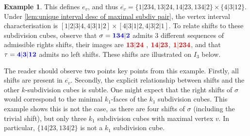 \documentclass{amsart}
\newcommand{\red}{\color{red}} %
\newcommand{\blue}{\color{blue}} %
\theoremstyle{definition}
\newtheorem{example}[theorem]{Example}
\newcommand{\subdivpairsv}{e_v}
\newcommand{\maxsubdivpairsv}{\overline{e_v}}
\begin{document}
\begin{example}
This defines $\subdivpairsv$, and thus $\maxsubdivpairsv=\{ 1|234, 13|24, 14|23, 134|2\} \times \{4|3|12\}$.
Under \cref{lem:unique interval desc of maximal subdiv pair}, the vertex interval characterisation is $[1|2|3|4, 4|3|1|2] \times [4|3|1|2, 4|3|2|1]$.
To relate shifts to these subdivision cubes, observe that $\sigma = \blue{\mathbf{134|2}}$ admits $3$ different sequences of admissible rights shifts, their images are $\red{\mathbf{13|24}}$ , $\red{\mathbf{14|23}}$, $\red{\mathbf{1|234}}$,
and that $\tau = \blue{\mathbf{4|3|12}}$ admits no left shifts.
These shifts are illustrated on $I_3$ below.
\begin{center}
{\small
{}
}
\end{center}

The reader should observe two points key  points from this example.
Firstly, all shifts are present in $\maxsubdivpairsv$.
Secondly, the explicit relationship between shifts and the other $k$-subdivision cubes is subtle.
One might expect that the right shifts of $\sigma$ would correspond to the minimal $k_1$-faces of the $k_1$ subdivision cubes.
This example shows this is not the case, as there are four shifts of $\sigma$ (including the trivial shift), but only three $k_1$ subdivision cubes with maximal vertex $v$.
In particular, $\{14|23, 134|2\}$ is not a $k_1$ subdivision cube.

\end{example}
\end{document}

